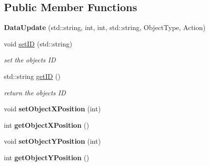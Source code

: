 \subsection*{Public Member Functions}
\begin{DoxyCompactItemize}
\item 
\mbox{\label{class_data_update_acfb4a6193fcc60a95972104db2419afa}} 
{\bfseries Data\+Update} (std\+::string, int, int, std\+::string, Object\+Type, Action)
\item 
\mbox{\label{class_data_update_a6514821c62a9747b36d910f0d0af07c8}} 
void \mbox{\hyperlink{class_data_update_a6514821c62a9747b36d910f0d0af07c8}{set\+ID}} (std\+::string)
\begin{DoxyCompactList}\small\item\em set the object\textquotesingle{}s ID \end{DoxyCompactList}\item 
\mbox{\label{class_data_update_a038f4be4ef2f840becdf08b3536b191b}} 
std\+::string \mbox{\hyperlink{class_data_update_a038f4be4ef2f840becdf08b3536b191b}{get\+ID}} ()
\begin{DoxyCompactList}\small\item\em return the object\textquotesingle{}s ID \end{DoxyCompactList}\item 
\mbox{\label{class_data_update_a67b18103f9cbc9885c558d6128a700f6}} 
void {\bfseries set\+Object\+X\+Position} (int)
\item 
\mbox{\label{class_data_update_a0f25e89a6c0862dd3d96536259e5c4c8}} 
int {\bfseries get\+Object\+X\+Position} ()
\item 
\mbox{\label{class_data_update_aa76087b3d0ddf4879dd7dc77615a878e}} 
void {\bfseries set\+Object\+Y\+Position} (int)
\item 
\mbox{\label{class_data_update_a1e3b0a795dd736bca9c8e868e7783d08}} 
int {\bfseries get\+Object\+Y\+Position} ()
\item 
\mbox{\label{class_data_update_a5441cb945510c8a71facb3989c459842}} 

\end{DoxyCompactItemize}
